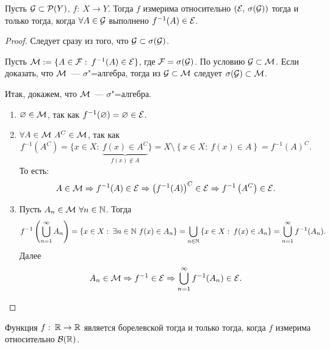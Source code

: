 \begin{claim}
    Пусть $\mathcal{G}\subset\mathcal{P}(Y)$, $f:\: X\to Y$. Тогда $f$ измерима относительно $(\mathcal{E},\, \sigma(\mathcal{G}))$
    тогда и только тогда, когда $\forall A\in\mathcal{G}$ выполнено $f^{-1}(A)\in\mathcal{E}$.

    \begin{proof}

        \circled{$\Rightarrow$} Следует сразу из того, что $\mathcal{G}\subset \sigma(\mathcal{G})$.

        \circled{$\Leftarrow$} Пусть $\mathcal{M}:=\{A\in\mathcal{F} :\: f^{-1}(A)\in\mathcal{E}\}$, где $\mathcal{F} =\sigma(\mathcal{G})$. По условию
        $\mathcal{G}\subset\mathcal{M}$. Если доказать, что $\mathcal{M}$~--- $\sigma$"=алгебра, тогда из $\mathcal{G}\subset\mathcal{M}$
        следует $\sigma(\mathcal{G})\subset\mathcal{M}$.

        Итак, докажем, что $\mathcal{M}$~--- $\sigma$"=алгебра.
        \begin{enumerate}
            \item $\varnothing \in\mathcal{M}$, так как $f^{-1}(\varnothing)=\varnothing\in\mathcal{E}$.
            \item $\forall A\in\mathcal{M}\ A^C\in\mathcal{M}$, так как
                  \[
                      f^{-1}(A^C)=\{x\in X:\: \underbrace{f(x)\in A^C}_{f(x)\notin A}\}=
                      X\setminus\left\{x\in X:\: f(x)\in A\right\}=f^{-1}(A)^C.
                  \]
                  То есть:
                  \[
                      A\in\mathcal{M}\Rightarrow f^{-1}(A)\in\mathcal{E}\Rightarrow \left(f^{-1}(A)\right)^C\in\mathcal{E}\Rightarrow
                      f^{-1}\left(A^C\right)\in\mathcal{E}.
                  \]
            \item Пусть $A_n\in\mathcal{M}\ \forall n\in\mathbb{N}$. Тогда
                  \[
                      f^{-1}\left(\bigcup_{n=1}^{\infty}A_n\right)=\left\{x\in X:\: \exists n\in \mathbb{N}\ f(x)\in A_n\right\}
                      =\bigcup_{n\in\mathbb{N}}\left\{x\in X:\: f(x)\in A_n\right\}=\bigcup_{n=1}^{\infty}f^{-1}(A_n).
                  \]
                  Далее
                  \[
                      A_n\in\mathcal{M}\Rightarrow f^{-1}\in\mathcal{E}\Rightarrow\bigcup_{n=1}^{\infty}f^{-1}(A_n)\in\mathcal{E}.
                  \]
        \end{enumerate}

    \end{proof}
\end{claim}

\begin{next0}
    Функция $f:\:\mathbb{R}\to\mathbb{R}$ является борелевской тогда и только тогда, когда $f$ измерима относительно
    $\mathcal{B}(\mathbb{R})$.
\end{next0}

